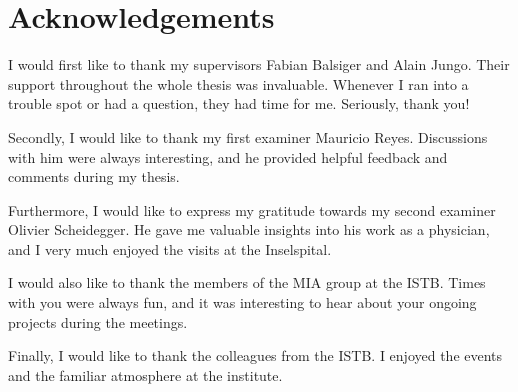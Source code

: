 \chapter*{Acknowledgements}
   
I would first like to thank my supervisors Fabian Balsiger and Alain Jungo. Their support throughout the whole thesis was invaluable. Whenever I ran into a trouble spot or had a question, they had time for me. Seriously, thank you!

Secondly, I would like to thank my first examiner Mauricio Reyes. Discussions with him were always interesting, and he provided helpful feedback and comments during my thesis.

Furthermore, I would like to express my gratitude towards my second examiner Olivier Scheidegger. He gave me valuable insights into his work as a physician, and I very much enjoyed the visits at the Inselspital.

I would also like to thank the members of the MIA group at the ISTB. Times with you were always fun, and it was interesting to hear about your ongoing projects during the meetings.

Finally, I would like to thank the colleagues from the ISTB. I enjoyed the events and the familiar atmosphere at the institute.

\endinput